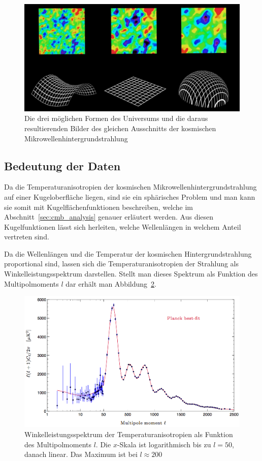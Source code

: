 \begin{figure}
	\centering
	\includegraphics[width=\linewidth]{cmb/images/universe_shapes.jpg}
	\caption{Die drei möglichen Formen des Universums und die daraus 
		resultierenden Bilder des gleichen Ausschnitts der kosmischen
		Mikrowellenhintergrundstrahlung}
	\label{fig:universe_shapes}
\end{figure}

\subsection{Bedeutung der Daten\label{subsec:cmb:data-meaning}}
Da die Temperaturanisotropien der kosmischen Mikrowellenhintergrundstrahlung 
auf einer Kugeloberfläche liegen, sind sie ein sphärisches Problem und man kann 
sie somit mit Kugelflächenfunktionen beschreiben, welche im 
Abschnitt~\ref{sec:cmb_analysis} genauer erläutert werden. Aus diesen 
Kugelfunktionen lässt sich herleiten, welche Wellenlängen in welchem Anteil 
vertreten sind.

Da die Wellenlängen und die Temperatur der kosmischen Hintergrundstrahlung proportional sind, lassen sich die Temperaturanisotropien der Strahlung als Winkelleistungsspektrum darstellen.
Stellt man dieses Spektrum als Funktion des Multipolmoments $l$ dar erhält man 
Abbildung~\ref{fig:planck_spectrum}.

\begin{figure}
	\centering
	\includegraphics[width=\linewidth]{cmb/images/mission_spectrum.png}
	\caption{Winkelleistungsspektrum der Temperaturanisotropien als Funktion 
	des Multipolmoments $l$.
	Die $x$-Skala ist logarithmisch bis zu $l = 50$, danach linear. Das Maximum 
	ist bei $l \approx 200$}
	\label{fig:planck_spectrum}
\end{figure}

